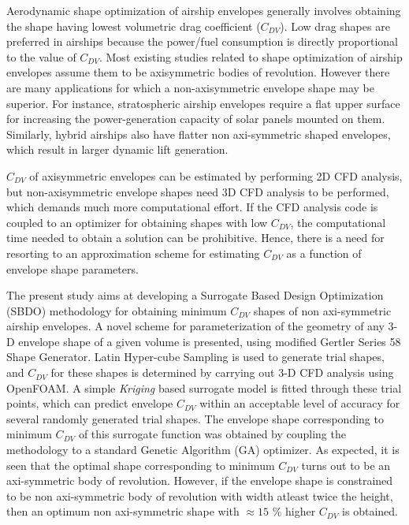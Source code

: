 \begin{Abstract}
	
Aerodynamic shape optimization of airship envelopes generally involves obtaining the shape having lowest volumetric drag coefficient ($C_{DV}$). Low drag shapes are preferred in airships because the power/fuel consumption is directly proportional to the value of $C_{DV}$. Most existing studies related to shape optimization of airship envelopes assume them to be axisymmetric bodies of revolution. However there are many applications for which a non-axisymmetric envelope shape may be superior. For instance, stratospheric airship envelopes require a flat upper surface for increasing the power-generation capacity of solar panels mounted on them. Similarly, hybrid airships also have flatter non axi-symmetric shaped envelopes, which result in larger dynamic lift generation.  

$C_{DV}$ of axisymmetric envelopes can be estimated by performing 2D CFD analysis, but non-axisymmetric envelope shapes need 3D CFD analysis to be performed, which demands much more computational effort. If the CFD analysis code is coupled to an optimizer for obtaining shapes with low $C_{DV}$, the computational time needed to obtain a solution can be prohibitive. Hence, there is a need for resorting to an approximation scheme for estimating $C_{DV}$ as a function of envelope shape parameters. 

The present study aims at developing a Surrogate Based Design Optimization (SBDO) methodology for obtaining minimum $C_{DV}$ shapes of non axi-symmetric airship envelopes. A novel scheme for parameterization of the geometry of any 3-D envelope shape of a given volume is presented, using modified Gertler Series 58 Shape Generator. Latin Hyper-cube Sampling is used to generate trial shapes, and $C_{DV}$ for these shapes is determined by carrying out 3-D CFD analysis using OpenFOAM\textsuperscript{\textregistered}. A simple \textit{Kriging} based surrogate model is fitted through these trial points, which can predict envelope $C_{DV}$ within an acceptable level of accuracy for several randomly generated trial shapes. The envelope shape corresponding to minimum $C_{DV}$ of this surrogate function was obtained by coupling the methodology to a standard Genetic Algorithm (GA) optimizer. As expected, it is seen that the optimal shape corresponding to minimum $C_{DV}$ turns out to be an axi-symmetric body of revolution. However, if the envelope shape is constrained to be non axi-symmetric body of revolution with width atleast twice the height, then an optimum non axi-symmetric shape with $\approx 15$ \% higher $C_{DV}$ is obtained.


\end{Abstract}
